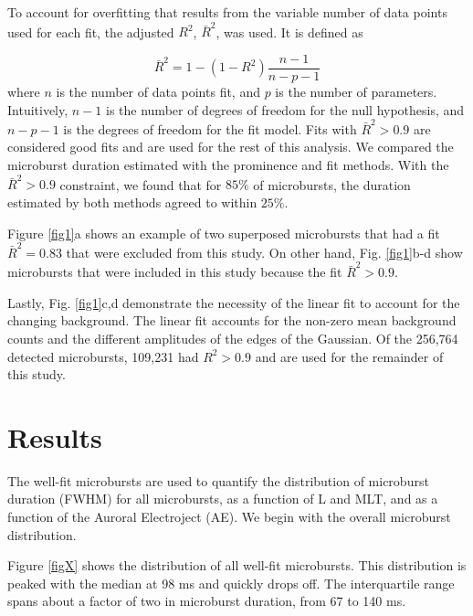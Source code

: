 \documentclass[draft]{agujournal2019}
\begin{document}
To account for overfitting that results from the variable number of data points used for each fit, the adjusted $R^2$, $\bar{R}^2$, was used. It is defined as

\begin{equation}
\bar{R}^2 = 1 - (1-R^2) \frac{n-1}{n-p-1}
\end{equation} where $n$ is the number of data points fit, and $p$ is the number of parameters. Intuitively, $n-1$ is the number of degrees of freedom for the null hypothesis, and $n-p-1$ is the degrees of freedom for the fit model. Fits with $\bar{R}^2 > 0.9$ are considered good fits and are used for the rest of this analysis. We compared the microburst duration estimated with the prominence and fit methods. With the $\bar{R}^2 > 0.9$ constraint, we found that for $85\%$ of microbursts, the duration estimated by both methods agreed to within $25\%$.

Figure \ref{fig1}a shows an example of two superposed microbursts that had a fit $\bar{R}^2 = 0.83$ that were excluded from this study. On other hand, Fig. \ref{fig1}b-d show microbursts that were included in this study because the fit $\bar{R}^2 > 0.9$.

Lastly, Fig. \ref{fig1}c,d demonstrate the necessity of the linear fit to account for the changing background. The linear fit accounts for the non-zero mean background counts and the different amplitudes of the edges of the Gaussian. Of the 256,764 detected microbursts, 109,231 had $R^2 > 0.9$ and are used for the remainder of this study.

\section{Results}\label{results}
The well-fit microbursts are used to quantify the distribution of microburst duration (FWHM) for all microbursts, as a function of L and MLT, and as a function of the Auroral Electroject (AE). We begin with the overall microburst distribution.

Figure \ref{figX} shows the distribution of all well-fit microbursts. This distribution is peaked with the median at 98 ms and quickly drops off. The interquartile range spans about a factor of two in microburst duration, from 67 to 140 ms. 
\end{document}
